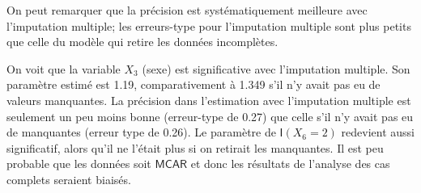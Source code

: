 \documentclass[
  11pt,
  letterpaper,
]{book}
\theoremstyle{definition}
\theoremstyle{remark}
\begin{document}
On peut remarquer que la précision est systématiquement meilleure avec
l'imputation multiple; les erreurs-type pour l'imputation multiple sont
plus petits que celle du modèle qui retire les données incomplètes.

On voit que la variable \(X_3\) (sexe) est significative avec
l'imputation multiple. Son paramètre estimé est 1.19, comparativement à
1.349 s'il n'y avait pas eu de valeurs manquantes. La précision dans
l'estimation avec l'imputation multiple est seulement un peu moins bonne
(erreur-type de 0.27) que celle s'il n'y avait pas eu de manquantes
(erreur type de 0.26). Le paramètre de \(\mathsf{I}(X_6=2)\) redevient
aussi significatif, alors qu'il ne l'était plus si on retirait les
manquantes. Il est peu probable que les données soit \(\mathsf{MCAR}\)
et donc les résultats de l'analyse des cas complets seraient biaisés.


\backmatter
\end{document}
